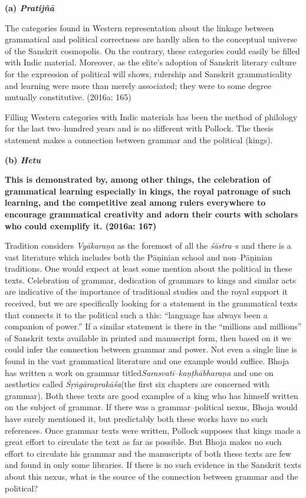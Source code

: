 \textbf{(a) \textit{Pratijñā }}

\begin{myquote}
The categories found in Western representation about the linkage between grammatical and political correctness are hardly alien to the conceptual universe of the Sanskrit cosmopolis. On the contrary, these categories could easily be ﬁlled with Indic material. Moreover, as the elite’s adoption of Sanskrit literary culture for the expression of political will shows, rulership and Sanskrit grammaticality and learning were more than merely associated; they were to some degree mutually constitutive. (2016a: 165)
\end{myquote}

Filling Western categories with Indic materials has been the method of philology for the last two–hundred years and is no different with Pollock. The thesis statement makes a connection between grammar and the political (kings).

\textbf{(b) \textit{Hetu}}

\begin{myquote}
\textbf{This is demonstrated by, among other things, the celebration of grammatical learning especially in kings, the royal patronage of such learning, and the competitive zeal among rulers everywhere to encourage grammatical creativity and adorn their courts with scholars who could exemplify it. (2016a: 167)}
\end{myquote}

Tradition considers \textit{Vyākaraṇa} as the foremost of all the \textit{śāstra}–s and there is a vast literature which includes both the Pāṇinian school and non–Pāṇinian traditions. One would expect at least some mention about the political in these texts. Celebration of grammar, dedication of grammars to kings and similar acts are indicative of the importance of traditional studies and the royal support it received, but we are specifically looking for a statement in the grammatical texts that connects it to the political such a this: “language has always been a companion of power.” If a similar statement is there in the “millions and millions” of Sanskrit texts available in printed and manuscript form, then based on it we could infer the connection between grammar and power. Not even a single line is found in the vast grammatical literature and one example would suffice. Bhoja has written a work on grammar titled\textit{Sarasvatī–kaṇṭhābharaṇa} and one on aesthetics called \textit{Śṛṅgāraprakāśa}(the first six chapters are concerned with grammar). Both these texts are good examples of a king who has himself written on the subject of grammar. If there was a grammar–political nexus, Bhoja would have surely mentioned it, but predictably both these works have no such references. Once grammar texts were written, Pollock supposes that kings made a great effort to circulate the text as far as possible. But Bhoja makes no such effort to circulate his grammar and the manuscripts of both these texts are few and found in only some libraries. If there is no such evidence in the Sanskrit texts about this nexus, what is the source of the connection between grammar and the political?

